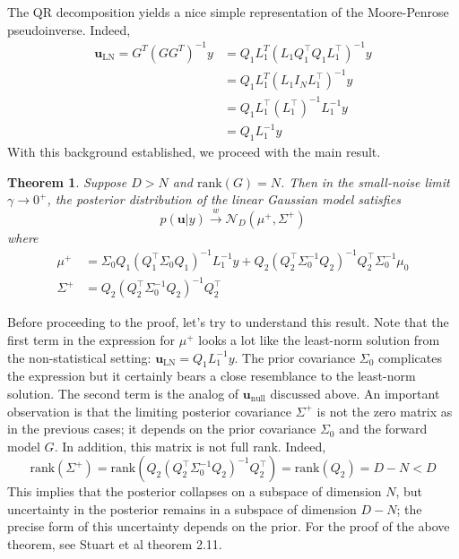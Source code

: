 \documentclass[12pt]{article}
\newcommand{\bpar}{\mathbf{u}} %
\newtheorem{thm}{Theorem}
\begin{document}
The QR decomposition yields a nice simple representation of the Moore-Penrose pseudoinverse. Indeed, 
\begin{align*}
\bpar_{\text{LN}} = G^T \left(G G^T \right)^{-1}y &= Q_1 L_1^T \left(L_1 Q_1^{\top} Q_1 L_1^{\top} \right)^{-1} y \\
									 &= Q_1 L_1^T \left(L_1 I_N L_1^{\top} \right)^{-1} y \\
									 &= Q_1 L_1^{\top} \left(L_1^{\top} \right)^{-1} L_1^{-1} y \\
									 &= Q_1 L_1^{-1} y
\end{align*}
With this background established, we proceed with the main result. 

\begin{thm}
Suppose $D > N$ and $\text{rank}(G) = N$. Then in the small-noise limit $\gamma \to 0^+$, the posterior distribution of the linear Gaussian model satisfies
\[p(\bpar|y) \overset{w}{\to} \mathcal{N}_D(\mu^+, \Sigma^+)\]
where 
\begin{align*}
\mu^+ &= \Sigma_0 Q_1\left(Q_1^\top \Sigma_0 Q_1 \right)^{-1} L_1^{-1} y + Q_2\left(Q_2^\top \Sigma_0^{-1} Q_2 \right)^{-1} Q_2^\top \Sigma_0^{-1} \mu_0 \\
\Sigma^+ &= Q_2 \left(Q_2^\top \Sigma_0^{-1} Q_2 \right)^{-1} Q_2^\top
\end{align*}
\end{thm}
Before proceeding to the proof, let's try to understand this result. Note that the first term in the expression for $\mu^+$ looks a lot like the least-norm solution 
from the non-statistical setting: $\bpar_{\text{LN}} = Q_1 L_1^{-1} y$. The prior covariance $\Sigma_0$ complicates the expression but it certainly bears a close 
resemblance to the least-norm solution. The second term is the analog of $\bpar_{\text{null}}$ discussed above. An important observation is that the limiting posterior 
covariance $\Sigma^+$ is not the zero matrix as in the previous cases; it depends on the prior covariance $\Sigma_0$ and the forward model $G$. In addition, this matrix 
is not full rank. Indeed, 
\[\text{rank}\left(\Sigma^+\right) = \text{rank}\left(Q_2 \left(Q_2^\top \Sigma_0^{-1} Q_2 \right)^{-1} Q_2^\top \right) = \text{rank}\left(Q_2 \right) = D - N < D\]
This implies that the posterior collapses on a subspace of dimension $N$, but uncertainty in the posterior remains in a subspace of dimension $D - N$; the 
precise form of this uncertainty depends on the prior. For the proof of the above theorem, see Stuart et al theorem 2.11. 
\end{document}
